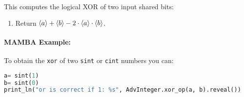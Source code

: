 This computes the logical XOR of two input shared bits:
\begin{enumerate}
\item Return $\langle a \rangle+\langle b \rangle-2 \cdot \langle a \rangle \cdot \langle b \rangle$.
\end{enumerate}
\paragraph{MAMBA Example:} To obtain the \verb|xor| of two \verb|sint| or \verb|cint| numbers you can: 
\begin{lstlisting}[language={python}]
a= sint(1)
b= sint(0)
print_ln("or is correct if 1: %s", AdvInteger.xor_op(a, b).reveal())
\end{lstlisting}

\iffalse
\note{Nigel}{Does not seem to be used anywhere}
\msubsubsection{$\mathsf{Symm}(f,\sshare{a_1},\ldots,\sshare{a_t})$:}
This takes a symmetric boolean function $f$ on $t$ binary inputs
and evaluates it at the points $\sshare{a_1},\ldots,\sshare{a_t}$,
where we assume $a_i \in \{0,1\}$.
We first pre-process the function $f$ so that we can write
\[ f(x_1,\ldots,x_t) = \phi(1+\sum_{i=1}^t x_i), \]
where the inner sum is over the integers and
$\phi:{1,2,\ldots,t+1} \longrightarrow \{0,1\}$.
We then write
\[ \phi(X) = \sum_{i=0}^t \alpha_i \cdot X^i \pmod{p} \]
using Lagrange interpolation.
So for example if we have $f(X_1,X_2)=X_1^2+X_1 \cdot X_2+X_2^2+1$
then $\phi$ is the function which maps 
$1 \longrightarrow 1$, $2 \longrightarrow 0$, $3 \longrightarrow 0$.
In which case $\phi(X)=X^2/2-5 \cdot X/2+3$.

To compute this function we have the algorithm
\begin{enumerate}
\item $\sshare{a} \asn 1+ \sum_{i=1}^t \sshare{a_i}$.
\item $(\sshare{a},\sshare{a^2},\ldots,\sshare{a^t})
	\asn \mathsf{PreMult}(\sshare{a},\ldots,\sshare{a},
			\{(1,1),\ldots,(1,t)\})$.
\item $\sshare{f(a_1,\ldots,a_t)}
	\asn \sum_{i=0}^t \alpha_i \cdot \sshare{a^i}$.
\end{enumerate}
\fi

